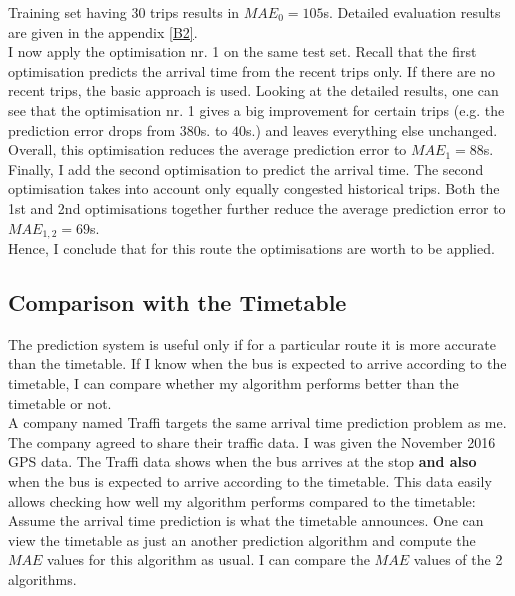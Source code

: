 \documentclass[12pt,a4paper,oneside,openright]{report}
\begin{document}
Training set having $30$ trips results in $MAE_0 = 105$s. Detailed
evaluation results are given in the appendix \ref{B2}. \\

I now apply the optimisation nr. 1 on the same test set. Recall that
the first optimisation predicts the arrival time from the recent trips only.
If there are no recent trips, the basic approach is used. Looking at the
detailed results, one can see that the optimisation nr. 1 gives a big improvement
for certain trips (e.g. the prediction error drops from $380$s. to $40$s.) and leaves
everything else unchanged. Overall, this optimisation reduces the average prediction
error to $MAE_1 = 88$s. \\

Finally, I add the second optimisation to predict the arrival time. The
second optimisation takes into account only equally congested historical trips.
Both the 1st and 2nd optimisations together further reduce the average
prediction error to $MAE_{1,2} = 69$s. \\

Hence, I conclude that for this route the optimisations are worth to be applied.

\newpage

\subsection*{Comparison with the Timetable}

The prediction system is useful only if for a particular route it is more accurate than
the timetable. If I know when the bus is expected to arrive according to the timetable,
I can compare whether my algorithm performs better than the timetable or not. \\

A company named Traffi targets the same arrival time prediction
problem as me. The company agreed to share their traffic
data. I was given the November 2016 GPS data. The Traffi data shows when the bus arrives
at the stop \textbf{and also} when the bus is expected to arrive according to the timetable.
This data easily allows checking how well my algorithm performs compared to the timetable: \\

Assume the arrival time prediction is what the timetable announces. One can view the
timetable as just an another prediction algorithm and compute the $MAE$ values for this
algorithm as usual. I can compare the $MAE$ values of the 2 algorithms. \\
\end{document}
